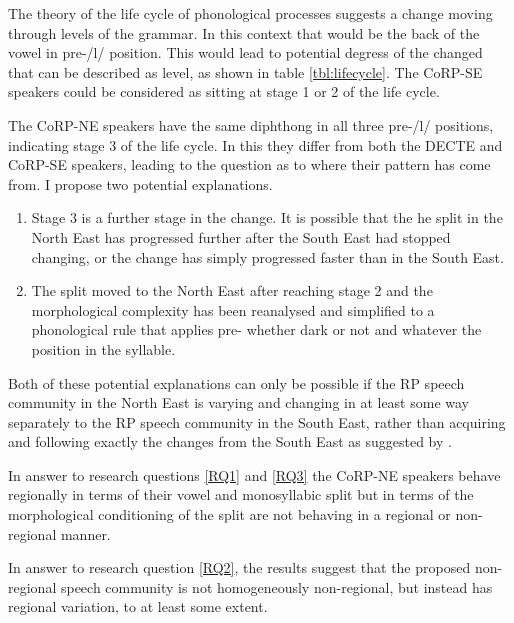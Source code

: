 \documentclass[../../../00.FullDoc/tex/Thesis]{subfiles}
\begin{document}
The theory of the life cycle of phonological processes \citep{BermudezOtero2015} suggests a change moving through levels of the grammar. In this context that would be the back of the \goat{} vowel in pre-/l/ position. This would lead to potential degress of the changed that can be described as level, as shown in table \ref{tbl:lifecycle}. The CoRP-SE speakers could be considered as sitting at stage 1 or 2 of the life cycle.

The CoRP-NE speakers have the same diphthong in all three pre-/l/ positions, indicating stage 3 of the life cycle. In this they differ from both the DECTE and CoRP-SE speakers, leading to the question as to where their pattern has come from. I propose two potential explanations.
\begin{enumerate}
	\item Stage 3 is a further stage in the change. It is possible that the he split in the North East has progressed further after the South East had stopped changing, or the change has simply progressed faster than in the South East. 
	\item The split moved to the North East after reaching stage 2 and the morphological complexity has been reanalysed and simplified to a phonological rule that applies pre- whether dark or not and whatever the position in the syllable.
\end{enumerate}

Both of these potential explanations can only be possible if the RP speech community in the North East is varying and changing in at least some way separately to the RP speech community in the South East, rather than acquiring and following exactly the changes from the South East as suggested by \citet{Trudgill2008}.

In answer to research questions \ref{RQ1} and \ref{RQ3} the CoRP-NE speakers behave regionally in terms of their \goat{} vowel and monosyllabic \GG{} split but in terms of the morphological conditioning of the split are not behaving in a regional or non-regional manner.

In answer to research question \ref{RQ2}, the results suggest that the proposed non-regional speech community is not homogeneously non-regional, but instead has regional variation, to at least some extent.



\onlyinsubfile{
	\listoftodos
	\pagebreak
	
	}
	
	
\end{document}
